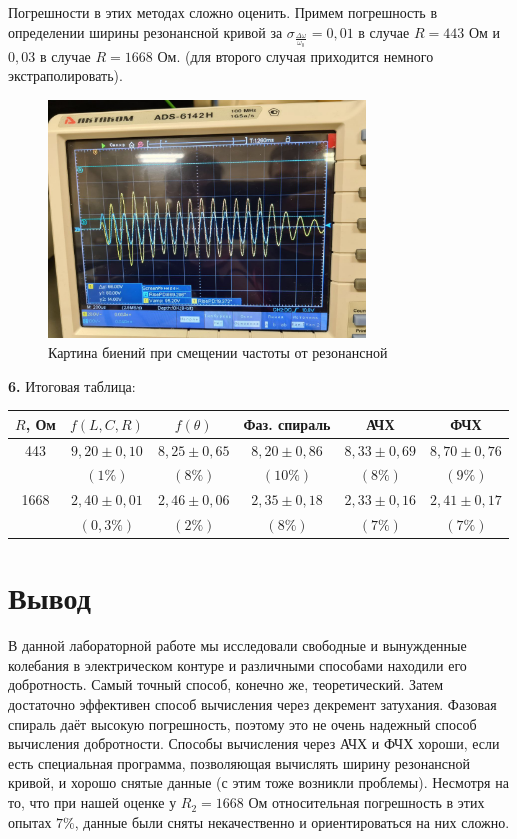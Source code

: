 \documentclass[a4paper, 12pt]{article}
\begin{document}
        Погрешности в этих методах сложно оценить. Примем погрешность в определении ширины резонансной кривой за $\sigma_{\frac{\Delta \omega}{\omega_0}} = 0,01$ в случае $R = 443$ Ом и $0,03$ в случае $R = 1668$ Ом. (для второго случая приходится немного экстраполировать).

        \begin{figure}[h]
            \centering
            \includegraphics[width = 0.75\textwidth]{img/osc.jpg}
            \caption{Картина биений при смещении частоты от резонансной}
        \end{figure}

        \newpage
        \textbf{6.} Итоговая таблица:
        \begin{table}[h]
            \centering
            \begin{tabular}{|c|c|c|c|c|c|}
                \hline
                $R$, Ом & $f(L, C, R)$ & $f(\theta)$ & Фаз. спираль & АЧХ & ФЧХ \\ \hline
                443 & $9,20 \pm 0,10$ & $8,25 \pm 0,65$& $8,20 \pm 0,86$ & $8,33 \pm 0,69$ & $8,70\pm 0,76$ \\
                & $(1\%)$ & $(8\%)$ & $(10\%)$ & $(8\%)$ & $(9\%)$  \\ \hline
                1668 & $2,40 \pm 0,01$ & $ 2,46 \pm 0,06$ & $ 2,35 \pm 0,18$ & $2,33 \pm 0,16  $ & $2,41 \pm 0,17 $ \\
                & $(0,3 \%)$ & $(2\%) $ & $(8\%) $ & $(7 \%) $ & $(7 \%) $ \\ \hline
            \end{tabular}
        \end{table}

	\section{Вывод}
	    В данной лабораторной работе мы исследовали свободные и вынужденные колебания в электрическом контуре и различными способами находили его добротность. Самый точный способ, конечно же, теоретический. Затем достаточно эффективен способ вычисления через декремент затухания. Фазовая спираль даёт высокую погрешность, поэтому это не очень надежный способ вычисления добротности. Способы вычисления через АЧХ и ФЧХ хороши, если есть специальная программа, позволяющая вычислять ширину резонансной кривой, и хорошо снятые данные (с этим тоже возникли проблемы). Несмотря на то, что при нашей оценке у $R_2 = 1668$ Ом относительная погрешность в этих опытах $7 \%$, данные были сняты некачественно и ориентироваться на них сложно.
\end{document}
